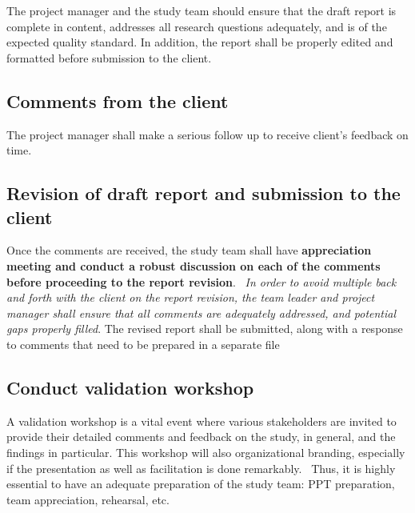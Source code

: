 \documentclass[
]{book}
\theoremstyle{definition}
\theoremstyle{definition}
\theoremstyle{definition}
\theoremstyle{definition}
\theoremstyle{remark}
\begin{document}
The project manager and the study team should ensure that the draft report is complete in content, addresses all research questions adequately, and is of the expected quality standard. In addition, the report shall be properly edited and formatted before submission to the client.

\hypertarget{comments-from-the-client}{%
\subsection{Comments from the client}\label{comments-from-the-client}}

The project manager shall make a serious follow up to receive client's feedback on time.

\hypertarget{revision-of-draft-report-and-submission-to-the-client}{%
\subsection{Revision of draft report and submission to the client}\label{revision-of-draft-report-and-submission-to-the-client}}

Once the comments are received, the study team shall have \textbf{appreciation meeting and conduct a
robust discussion on each of the comments before proceeding to the report revision}.~ \emph{In order to avoid multiple back and forth with the client on the report revision, the team leader and project manager shall ensure that all comments are adequately addressed, and potential gaps properly filled}. The revised report shall be submitted, along with a response to comments that need to be prepared in a separate file

\hypertarget{conduct-validation-workshop}{%
\subsection{Conduct validation workshop}\label{conduct-validation-workshop}}

A validation workshop is a vital event where various stakeholders are invited to provide their detailed comments and feedback on the study, in general, and the findings in particular. This workshop will also organizational branding, especially if the presentation as well as facilitation is done remarkably.~ Thus, it is highly essential to have an adequate preparation of the study team: PPT preparation, team appreciation, rehearsal, etc.
\end{document}
